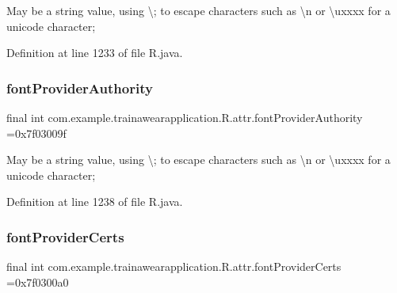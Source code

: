 May be a string value, using \textquotesingle{}\textbackslash{};\textquotesingle{} to escape characters such as \textquotesingle{}\textbackslash{}n\textquotesingle{} or \textquotesingle{}\textbackslash{}uxxxx\textquotesingle{} for a unicode character; 

Definition at line 1233 of file R.\+java.

\mbox{\label{classcom_1_1example_1_1trainawearapplication_1_1_r_1_1attr_a7b0f91e56803c7a1e804082298193bda}} 
\subsubsection{\texorpdfstring{fontProviderAuthority}{fontProviderAuthority}}
{\footnotesize\ttfamily final int com.\+example.\+trainawearapplication.\+R.\+attr.\+font\+Provider\+Authority =0x7f03009f\hspace{0.3cm}{\ttfamily [static]}}

May be a string value, using \textquotesingle{}\textbackslash{};\textquotesingle{} to escape characters such as \textquotesingle{}\textbackslash{}n\textquotesingle{} or \textquotesingle{}\textbackslash{}uxxxx\textquotesingle{} for a unicode character; 

Definition at line 1238 of file R.\+java.

\mbox{\label{classcom_1_1example_1_1trainawearapplication_1_1_r_1_1attr_ac98830661d303a6b383c53e042d7545c}} 
\subsubsection{\texorpdfstring{fontProviderCerts}{fontProviderCerts}}
{\footnotesize\ttfamily final int com.\+example.\+trainawearapplication.\+R.\+attr.\+font\+Provider\+Certs =0x7f0300a0\hspace{0.3cm}{\ttfamily [static]}}

